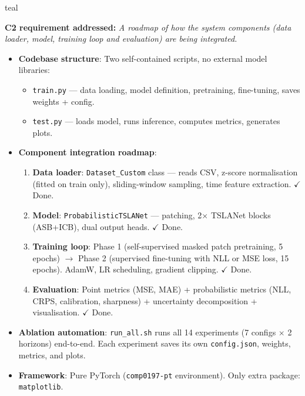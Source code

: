 \documentclass[11pt,a4paper]{article}
\begin{document}
\newpage

\begin{speakerbox}{teal}

\textbf{C2 requirement addressed:} \textit{A roadmap of how the system components (data loader, model, training loop and evaluation) are being integrated.}

\begin{talkingpoints}
\begin{itemize}[leftmargin=*]
    \item \textbf{Codebase structure}: Two self-contained scripts, no external model libraries:
    \begin{itemize}
        \item \texttt{train.py} --- data loading, model definition, pretraining, fine-tuning, saves weights + config.
        \item \texttt{test.py} --- loads model, runs inference, computes metrics, generates plots.
    \end{itemize}
    \item \textbf{Component integration roadmap}:
    \begin{enumerate}[leftmargin=*]
        \item \textbf{Data loader}: \texttt{Dataset\_Custom} class --- reads CSV, z-score normalisation (fitted on train only), sliding-window sampling, time feature extraction. $\checkmark$ Done.
        \item \textbf{Model}: \texttt{ProbabilisticTSLANet} --- patching, 2$\times$ TSLANet blocks (ASB+ICB), dual output heads. $\checkmark$ Done.
        \item \textbf{Training loop}: Phase 1 (self-supervised masked patch pretraining, 5 epochs) $\to$ Phase 2 (supervised fine-tuning with NLL or MSE loss, 15 epochs). AdamW, LR scheduling, gradient clipping. $\checkmark$ Done.
        \item \textbf{Evaluation}: Point metrics (MSE, MAE) + probabilistic metrics (NLL, CRPS, calibration, sharpness) + uncertainty decomposition + visualisation. $\checkmark$ Done.
    \end{enumerate}
    \item \textbf{Ablation automation}: \texttt{run\_all.sh} runs all 14 experiments (7 configs $\times$ 2 horizons) end-to-end. Each experiment saves its own \texttt{config.json}, weights, metrics, and plots.
    \item \textbf{Framework}: Pure PyTorch (\texttt{comp0197-pt} environment). Only extra package: \texttt{matplotlib}.
\end{itemize}
\end{talkingpoints}


\end{speakerbox}
\end{document}
